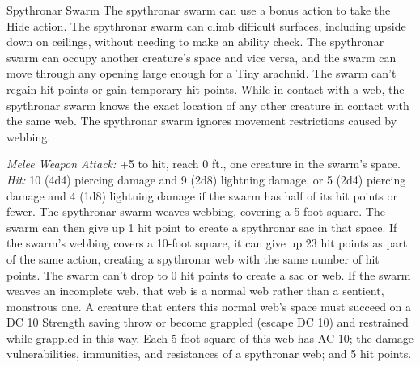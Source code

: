 \documentclass[10pt,a4paper,twoside,twocolumn,openany,bg=print,nodeprecatedcode]{dndbook}
\begin{document}
\begin{DndMonster}[float*=t]{Spythronar Swarm}
\DndMonsterBasics[
armor-class = {13},
hit-points = {\DndDice{10d8}},
speed = {30 ft., 30 ft. (key)}
]
\DndMonsterAbilityScores[
 str = 5,
 dex = 17,
 con = 10,
 int = 3,
 wis = 11,
 cha = 3
]
\DndMonsterDetails[
skills = {Stealth +5},
damage-resistances = {bludgeoning, piercing, slashing},
damage-immunities = {lightning},
senses = {darkvision 60 ft., tremorsense 30 ft., passive perception 10},
challenge = 2,
]
The spythronar swarm can use a bonus action to take the Hide action.
The spythronar swarm can climb difficult surfaces, including upside down on ceilings, without needing to make an ability check.
The spythronar swarm can occupy another creature's space and vice versa, and the swarm can move through any opening large enough for a Tiny arachnid. The swarm can't regain hit points or gain temporary hit points.
While in contact with a web, the spythronar swarm knows the exact location of any other creature in contact with the same web.
The spythronar swarm ignores movement restrictions caused by webbing.
\par
{}
\textsl{Melee Weapon Attack:} +5 to hit, reach 0 ft., one creature in the swarm's space. \textsl{Hit:} 10 (4d4) piercing damage and 9 (2d8) lightning damage, or 5 (2d4) piercing damage and 4 (1d8) lightning damage if the swarm has half of its hit points or fewer.
The spythronar swarm weaves webbing, covering a 5-foot square. The swarm can then give up 1 hit point to create a spythronar sac in that space. If the swarm's webbing covers a 10-foot square, it can give up 23 hit points as part of the same action, creating a spythronar web with the same number of hit points. The swarm can't drop to 0 hit points to create a sac or web.
If the swarm weaves an incomplete web, that web is a normal web rather than a sentient, monstrous one. A creature that enters this normal web's space must succeed on a DC 10 Strength saving throw or become grappled (escape DC 10) and restrained while grappled in this way. Each 5-foot square of this web has AC 10; the damage vulnerabilities, immunities, and resistances of a spythronar web; and 5 hit points.
\end{DndMonster}


\clearpage
\end{document}
